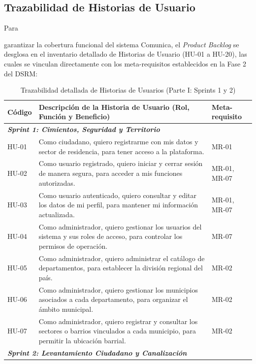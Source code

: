 \newpage
\subsection{Trazabilidad de Historias de Usuario}

\hypertarget{subsec:backlog1}{Para} garantizar la cobertura funcional del sistema Comunica, el \textit{Product Backlog} se desglosa en el inventario detallado de Historias de Usuario (HU-01 a HU-20), las cuales se vinculan directamente con los meta-requisitos establecidos en la Fase 2 del DSRM:

\begin{table}[!htbp]
	\centering
	\caption{Trazabilidad detallada de Historias de Usuarios (Parte I: Sprints 1 y 2)}
	\label{tab:inventario_hu_parte1}
	\begin{tabularx}{\textwidth}{p{1.2cm} X p{2.5cm}}
		\toprule
		\textbf{Código} & \textbf{Descripción de la Historia de Usuario (Rol, Función y Beneficio)} & \textbf{Meta-requisito} \\ 
		\midrule
		\multicolumn{3}{l}{\textit{\textbf{Sprint 1: Cimientos, Seguridad y Territorio}}} \\ 
		\addlinespace
		HU-01 & Como ciudadano, quiero registrarme con mis datos y sector de residencia, para tener acceso a la plataforma. & MR-01 \\ \addlinespace
		HU-02 & Como usuario registrado, quiero iniciar y cerrar sesión de manera segura, para acceder a mis funciones autorizadas. & MR-01, MR-07 \\ \addlinespace
		HU-03 & Como usuario autenticado, quiero consultar y editar los datos de mi perfil, para mantener mi información actualizada. & MR-01, MR-07 \\ \addlinespace
		HU-04 & Como administrador, quiero gestionar los usuarios del sistema y sus roles de acceso, para controlar los permisos de operación. & MR-07 \\ \addlinespace
		HU-05 & Como administrador, quiero administrar el catálogo de departamentos, para establecer la división regional del país. & MR-02 \\ \addlinespace
		HU-06 & Como administrador, quiero gestionar los municipios asociados a cada departamento, para organizar el ámbito municipal. & MR-02 \\ \addlinespace
		HU-07 & Como administrador, quiero registrar y consultar los sectores o barrios vinculados a cada municipio, para permitir la ubicación barrial. & MR-02 \\ 
		\midrule
		\multicolumn{3}{l}{\textit{\textbf{Sprint 2: Levantamiento Ciudadano y Canalización}}} \\ 

\end{tabularx}
\end{table}
